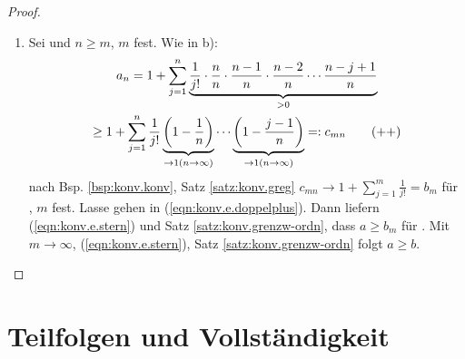 \documentclass[12pt]{scrreprt}
\begin{document}
\begin{bsp}
\begin{proof}
\begin{enumerate}
\begin{equation}
\binom{n}{j}\frac{1}{n^j} = \frac{1}{j!}\cdot\frac{n!}{(n-j)!}\cdot\frac{1}{n^j} = \frac{1}{j!}\cdot\underbrace{\frac{n}{n}}_{=1}\cdot\underbrace{\frac{n-1}{n}}_{\in(0,1)}\cdot\underbrace{\frac{n-2}{n}}_{\in(0,1)}\dotsm\underbrace{\frac{n-j+1}{n}}_{\in(0,1)} \le \frac{1}{j!} \le \frac{1}{2^{j-1}}
\tag{$+$} \end{equation}
\emph{Behauptung.} $2^{n-1}\le n!\,\forall\,\nat{}$
\begin{proof} (per vollst. Ind.)\\
IA: $n=1$ ist klar.\\
IS: Beh. gelte für ein  (IV).\\
\folgt $2^n \nach{\le}{IV} 2n! \le (n+1)n! = (n+1)!$
\end{proof}
\begin{multline*}
\folgt a_n=1+\sum_{j=1}^{n}\binom{n}{j}\frac{1}{n^j} \nach{\le}{(\ref{eqn:konv.e.plus})} 1 + \sum_{j=1}^{n} \frac{1}{j!} = b_n\\
\le 1+\sum_{j=1}^{n} \frac{1}{2^{j-1}} \wegen{=}{k:=j-1} 1 + \sum_{k=0}^{n-1} \left(\frac12\right)^k \nach{=}{\ref{eqn:vor.np1-ueber-j}} 1+\frac{1-\left(\frac12\right)^n}{1-\frac12} < 1 + \frac{1}{\frac12} = 3
\end{multline*}
\item Sei  und $n\ge m$, $m$ fest. Wie in b):
\begin{multline*} \label{eqn:konv.e.doppelplus}
a_n=1+\sum_{j=1}^{n}\underbrace{\frac{1}{j!}\cdot\frac{n}{n}\cdot\frac{n-1}{n}\cdot\frac{n-2}{n}\dotsm\frac{n-j+1}{n}}_{>0}\\\ge
1+\sum_{j=1}^{n}\frac{1}{j!}\underbrace{\left(1-\frac1n\right)}_{\to1(n\rightarrow\infty)}\dotsm\underbrace{\left(1-\frac{j-1}{n}\right)}_{\to1(n\rightarrow\infty)}=:c_{mn} \tag{$++$}
\end{multline*}
nach Bsp. \ref{bsp:konv.konv}, Satz \ref{satz:konv.greg} \folgt $c_{mn}\to 1+\sum_{j=1}^{m} \frac{1}{j!}=b_m$ für \ninf, $m$ fest. Lasse \ninf gehen in (\ref{eqn:konv.e.doppelplus}). Dann liefern (\ref{eqn:konv.e.stern}) und Satz \ref{satz:konv.grenzw-ordn}, dass $a\ge b_m$ für . Mit $m\to\infty$, (\ref{eqn:konv.e.stern}), Satz \ref{satz:konv.grenzw-ordn} folgt $a\ge b$.
\end{enumerate}
\end{proof}
\end{bsp}

\section{Teilfolgen und Vollständigkeit}
\label{sec:konv.teilfolgen}
\end{document}
